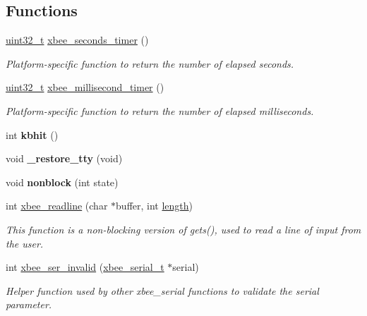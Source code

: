 \subsection*{Functions}
\begin{DoxyCompactItemize}
\item 
\hyperlink{group__hal__dos_ga09a1e304d66d35dd47daffee9731edaa}{uint32\+\_\+t} \hyperlink{group__hal__posix_gad66d00b144089426f04db771be5baa8b}{xbee\+\_\+seconds\+\_\+timer} ()
\begin{DoxyCompactList}\small\item\em Platform-\/specific function to return the number of elapsed seconds. \end{DoxyCompactList}\item 
\hyperlink{group__hal__dos_ga09a1e304d66d35dd47daffee9731edaa}{uint32\+\_\+t} \hyperlink{group__hal__posix_ga63bb246b86f72e88fa8ddc7a429c0e67}{xbee\+\_\+millisecond\+\_\+timer} ()
\begin{DoxyCompactList}\small\item\em Platform-\/specific function to return the number of elapsed milliseconds. \end{DoxyCompactList}\item 
\mbox{\label{group__hal__posix_gad5451da499ab9d3907da8dd7060ab677}} 
int {\bfseries kbhit} ()
\item 
\mbox{\label{group__hal__posix_ga6aa3e8753324b2be527b25c179239bed}} 
void {\bfseries \+\_\+restore\+\_\+tty} (void)
\item 
\mbox{\label{group__hal__posix_gaf880c0009d395be5bfbd579e7f72f645}} 
void {\bfseries nonblock} (int state)
\item 
int \hyperlink{group__hal__posix_ga8c0c80b64f63d395e718172190b21fcc}{xbee\+\_\+readline} (char $\ast$buffer, int \hyperlink{group__zdo_gab2b3adeb2a67e656ff030b56727fd0ac}{length})
\begin{DoxyCompactList}\small\item\em This function is a non-\/blocking version of gets(), used to read a line of input from the user. \end{DoxyCompactList}\item 
int \hyperlink{group__hal__posix_ga3c79f6b72b6cfc3cc5c4524450f661b9}{xbee\+\_\+ser\+\_\+invalid} (\hyperlink{structxbee__serial__t}{xbee\+\_\+serial\+\_\+t} $\ast$serial)
\begin{DoxyCompactList}\small\item\em Helper function used by other xbee\+\_\+serial functions to validate the {\itshape serial} parameter. \end{DoxyCompactList}\item 

\end{DoxyCompactItemize}
